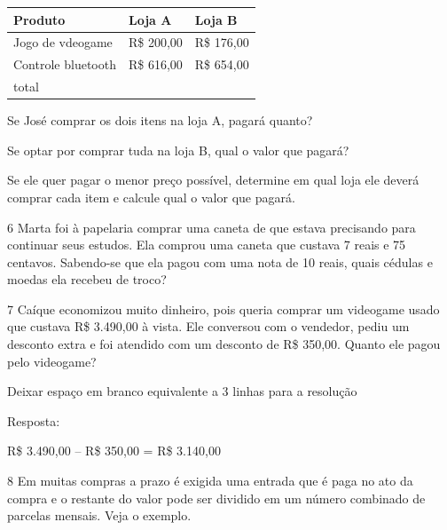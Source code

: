 {\begin{longtable}[]{@{}lll@{}}
\toprule
Produto & Loja A & Loja B\tabularnewline
\midrule
\endhead
Jogo de vdeogame & R\$ 200,00 & R\$ 176,00\tabularnewline
Controle bluetooth & R\$ 616,00 & R\$ 654,00\tabularnewline
total & &\tabularnewline
\bottomrule
\end{longtable}

\begin{escolha}

\item
  Se José comprar os dois itens na loja A, pagará quanto?

\item
  Se optar por comprar tuda na loja B, qual o valor que pagará?

\item
  Se ele quer pagar o menor preço possível, determine em qual loja ele
  deverá comprar cada item e calcule qual o valor que pagará.
\end{escolha}

\num{6} Marta foi à papelaria comprar uma caneta de que estava precisando para
continuar seus estudos. Ela comprou uma caneta que custava 7 reais e 75
centavos. Sabendo-se que ela pagou com uma nota de 10 reais, quais
cédulas e moedas ela recebeu de troco?


\num{7} Caíque economizou muito dinheiro, pois queria comprar um videogame usado
que custava R\$ 3.490,00 à vista. Ele conversou com o vendedor, pediu
um desconto extra e foi atendido com um desconto de R\$ 350,00. Quanto ele pagou pelo videogame?

Deixar espaço em branco equivalente a 3 linhas para a resolução

Resposta:

R\$ 3.490,00 -- R\$ 350,00 = R\$ 3.140,00

\num{8} Em muitas compras a prazo é exigida uma entrada que é paga no ato da
compra e o restante do valor pode ser dividido em um número combinado de
parcelas mensais. Veja o exemplo.

}
